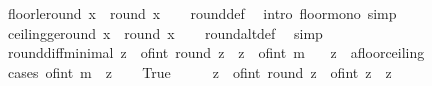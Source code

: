 \begin{isabellebody}
\endisatagproof
{\isafoldproof}%
%
\isadelimproof
\isanewline
%
\endisadelimproof
\isanewline
{}\isamarkupfalse%
\ floor{\isacharunderscore}{\kern0pt}le{\isacharunderscore}{\kern0pt}round{\isacharcolon}{\kern0pt}\ {\isachardoublequoteopen}{\isasymlfloor}x{\isasymrfloor}\ {\isasymle}\ round\ x{\isachardoublequoteclose}\isanewline
%
\isadelimproof
\ \ %
\endisadelimproof
%
\isatagproof
{}\isamarkupfalse%
\ round{\isacharunderscore}{\kern0pt}def\ \isamarkupfalse%
\ {\isacharparenleft}{\kern0pt}intro\ floor{\isacharunderscore}{\kern0pt}mono{\isacharparenright}{\kern0pt}\ simp%
\endisatagproof
{\isafoldproof}%
%
\isadelimproof
\isanewline
%
\endisadelimproof
\isanewline
{}\isamarkupfalse%
\ ceiling{\isacharunderscore}{\kern0pt}ge{\isacharunderscore}{\kern0pt}round{\isacharcolon}{\kern0pt}\ {\isachardoublequoteopen}{\isasymlceil}x{\isasymrceil}\ {\isasymge}\ round\ x{\isachardoublequoteclose}\isanewline
%
\isadelimproof
\ \ %
\endisadelimproof
%
\isatagproof
{}\isamarkupfalse%
\ round{\isacharunderscore}{\kern0pt}altdef\ \isamarkupfalse%
\ simp%
\endisatagproof
{\isafoldproof}%
%
\isadelimproof
\isanewline
%
\endisadelimproof
\isanewline
{}\isamarkupfalse%
\ round{\isacharunderscore}{\kern0pt}diff{\isacharunderscore}{\kern0pt}minimal{\isacharcolon}{\kern0pt}\ {\isachardoublequoteopen}{\isasymbar}z\ {\isacharminus}{\kern0pt}\ of{\isacharunderscore}{\kern0pt}int\ {\isacharparenleft}{\kern0pt}round\ z{\isacharparenright}{\kern0pt}{\isasymbar}\ {\isasymle}\ {\isasymbar}z\ {\isacharminus}{\kern0pt}\ of{\isacharunderscore}{\kern0pt}int\ m{\isasymbar}{\isachardoublequoteclose}\isanewline
\ \ \ z\ {\isacharcolon}{\kern0pt}{\isacharcolon}{\kern0pt}\ {\isachardoublequoteopen}{\isacharprime}{\kern0pt}a{\isacharcolon}{\kern0pt}{\isacharcolon}{\kern0pt}floor{\isacharunderscore}{\kern0pt}ceiling{\isachardoublequoteclose}\isanewline
%
\isadelimproof
%
\endisadelimproof
%
\isatagproof
{}\isamarkupfalse%
\ {\isacharparenleft}{\kern0pt}cases\ {\isachardoublequoteopen}of{\isacharunderscore}{\kern0pt}int\ m\ {\isasymge}\ z{\isachardoublequoteclose}{\isacharparenright}{\kern0pt}\isanewline
\ \ \isamarkupfalse%
\ True\isanewline
\ \ \isamarkupfalse%
\ \isamarkupfalse%
\ {\isachardoublequoteopen}{\isasymbar}z\ {\isacharminus}{\kern0pt}\ of{\isacharunderscore}{\kern0pt}int\ {\isacharparenleft}{\kern0pt}round\ z{\isacharparenright}{\kern0pt}{\isasymbar}\ {\isasymle}\ {\isasymbar}of{\isacharunderscore}{\kern0pt}int\ {\isasymlceil}z{\isasymrceil}\ {\isacharminus}{\kern0pt}\ z{\isasymbar}{\isachardoublequoteclose}\isanewline

\end{isabellebody}
